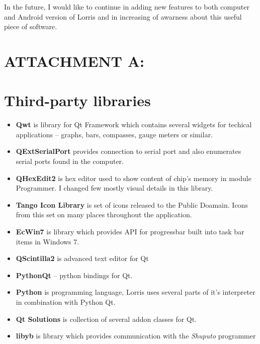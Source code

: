 \documentclass[12pt, a4paper, oneside]{article}
\newcommand{\It}{\textit}  %
\begin{document}
In the future, I would like to continue in adding new features to both computer and Android version of Lorris and in increasing of awarness about this useful piece of software.




\newpage
\section*{ATTACHMENT A:}
\section*{Third-party libraries}
\begin{itemize}
    \item {\bf Qwt}\cite{qwt} is library for Qt Framework which contains several widgets for techical applications -- graphs, bars, compasses, gauge meters or similar. 
    \item {\bf QExtSerialPort}\cite{qext} provides connection to serial port and also enumerates serial ports found in the computer.
    \item {\bf QHexEdit2}\cite{qhex} is hex editor used to show content of chip's memory in module Programmer. I changed few mostly visual details in this library.
    \item {\bf Tango Icon Library}\cite{tango} is set of icons released to the Public Doamain. Icons from this set on many places throughout the application.
    \item {\bf EcWin7}\cite{ecwin7} is library which provides API for progressbar built into task bar items in Windows 7.
    \item {\bf QScintilla2}\cite{qsci} is advanced text editor for Qt
    \item {\bf PythonQt}\cite{pythonqt} -- python bindings for Qt.
    \item {\bf Python}\cite{python} is programming language, Lorris uses several parts of it's interpreter in combination with Python Qt.
    \item {\bf Qt Solutions}\cite{qtsolutions} is collection of several addon classes for Qt.
    \item {\bf libyb}\cite{libyb} is library which provides communication with the \It{Shuputo} programmer
\end{itemize}
\end{document}
